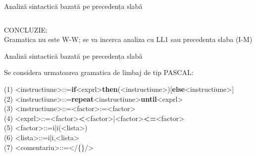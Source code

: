 \documentclass[pdf]{beamer}
\begin{document}
\begin{frame}{Analiză sintactică bazată pe precedența slabă}
\begin{center}
\begin{table}
\begin{tabular}{| c | c | c | c | c | c | c | c | c | c | c | c | c | c | c | }
\end{tabular}
\end{table}
\end{center}
\scriptsize	
\color{red}
CONCLUZIE:\\
Gramatica nu este W-W; se va incerca analiza cu LL1 sau precedenta slaba (I-M)\\
\end{frame}



\begin{frame}{Analiză sintactică bazată pe precedența slabă}
\begin{center}
    {Se considera urmatoarea gramatica de limbaj de tip PASCAL:}\\
\end{center}
\scriptsize
    (1) <instructiune>::=\textbf{if}<exprl>\textbf{then}(<instructiune>)[\textbf{else}<instructiune>]\\
    (2) <instructiune>::=\textbf{repeat}<instructiune>\textbf{until}<exprl>\\
    (3) <instructiune>::=<factor>:=<factor>\\
    (4) <exprl>::=<factor>\textbf{<}<factor>|<factor>\textbf{<=}<factor>\\
    (5) <factor>::=i|i(<lista>)\\
    (6) <lista>::=i|i,<lista>\\
    (7) <comentariu>::=</\{<orice caracter>\}/>\\
\end{frame}



\end{document}
